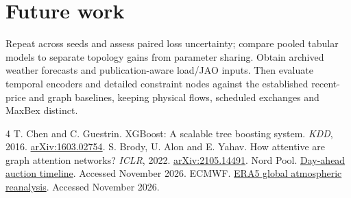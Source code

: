 \documentclass{article}
\begin{document}
\section{Future work}
Repeat across seeds and assess paired loss uncertainty; compare pooled tabular
models to separate topology gains from parameter sharing. Obtain archived weather
forecasts and publication-aware load/JAO inputs. Then evaluate temporal encoders
and detailed constraint nodes against the established recent-price and graph
baselines, keeping physical flows, scheduled exchanges and MaxBex distinct.
\fi

\begin{thebibliography}{4}\small
{} T. Chen and C. Guestrin. XGBoost: A scalable tree boosting system.
\emph{KDD}, 2016. \href{https://arxiv.org/abs/1603.02754}{arXiv:1603.02754}.
 S. Brody, U. Alon and E. Yahav. How attentive are graph attention
networks? \emph{ICLR}, 2022. \href{https://arxiv.org/abs/2105.14491}{arXiv:2105.14491}.
 Nord Pool. \href{https://www.nordpoolgroup.com/en/the-power-market/Day-ahead-market/}{Day-ahead auction timeline}. Accessed November 2026.
 ECMWF. \href{https://www.ecmwf.int/en/forecasts/datasets/complete-era5-global-atmospheric-reanalysis}{ERA5 global atmospheric reanalysis}. Accessed November 2026.
\end{thebibliography}
\end{document}
